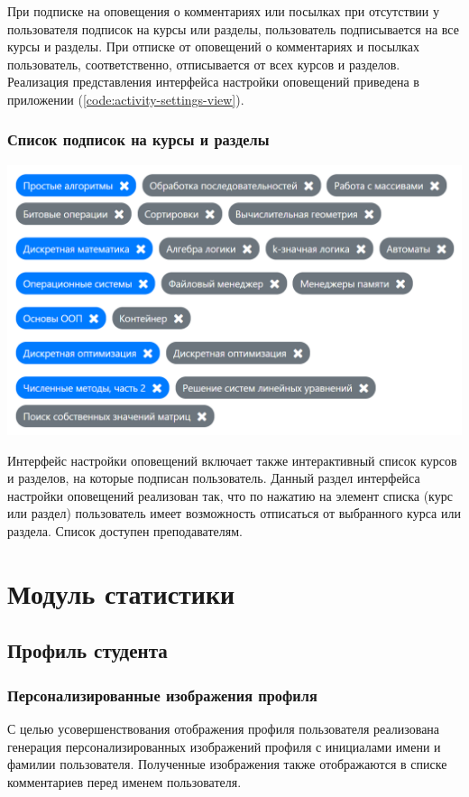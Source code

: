 \documentclass[14pt, a4paper, oneside]{extarticle}
\begin{document}
При подписке на оповещения о комментариях или посылках при отсутствии у пользователя подписок на курсы или разделы, пользователь подписывается на все курсы и разделы. При отписке от оповещений о комментариях и посылках пользователь, соответственно, отписывается от всех курсов и разделов. Реализация представления интерфейса настройки оповещений приведена в приложении (\ref{code:activity-settings-view}).
\subsubsection{Список подписок на курсы и разделы}
\begin{center}
    \includegraphics[scale=0.45]{courses-contests-subscriptions}
\end{center}

Интерфейс настройки оповещений включает также интерактивный список курсов и разделов, на которые подписан пользователь. Данный раздел интерфейса настройки оповещений реализован так, что по нажатию на элемент списка (курс или раздел) пользователь имеет возможность отписаться от выбранного курса или раздела. Список доступен преподавателям.
\newpage

\section{Модуль статистики}
\subsection{Профиль студента}
\subsubsection{Персонализированные изображения профиля}
С целью усовершенствования отображения профиля пользователя реализована генерация персонализированных изображений профиля с инициалами имени и фамилии пользователя. Полученные изображения также отображаются в списке комментариев перед именем пользователя.
\end{document}
